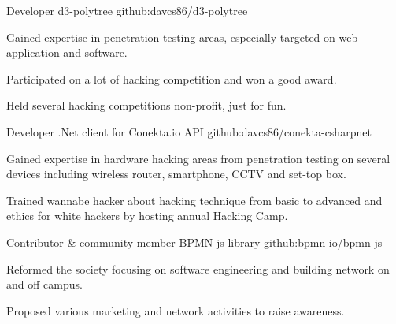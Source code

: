 


\begin{cventries}


\cventry
{Developer} %
{d3-polytree} %
{github:davcs86/d3-polytree} %
{ } %
{ %
	\begin{cvitems}
		\item {Gained expertise in penetration testing areas, especially targeted on web application and software.}
		\item {Participated on a lot of hacking competition and won a good award.}
		\item {Held several hacking competitions non-profit, just for fun.}
	\end{cvitems}
}


\cventry
{Developer} %
{.Net client for Conekta.io API} %
{github:davcs86/conekta-csharpnet} %
{ } %
{ %
	\begin{cvitems}
		\item {Gained expertise in hardware hacking areas from penetration testing on several devices including wireless router, smartphone, CCTV and set-top box.}
		\item {Trained wannabe hacker about hacking technique from basic to advanced and ethics for white hackers by hosting annual Hacking Camp.}
	\end{cvitems}
}


\cventry
{Contributor \& community member} %
{BPMN-js library} %
{github:bpmn-io/bpmn-js} %
{ } %
{ %
	\begin{cvitems}
		\item {Reformed the society focusing on software engineering and building network on and off campus.}
		\item {Proposed various marketing and network activities to raise awareness.}
	\end{cvitems}
}


\end{cventries}
